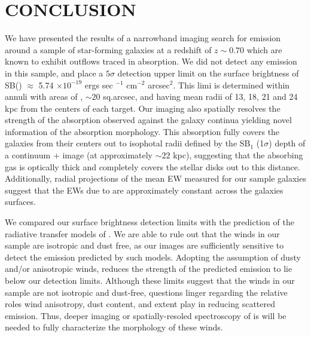 \documentclass[twocolumn]{aastex61}
\begin{document}
\section{CONCLUSION}\label{sec:conclusion}
We have presented the results of a narrowband imaging search for  emission around a sample of star-forming galaxies at a redshift of $z \sim 0.70$ which are known to exhibit outflows traced in  absorption. We did not detect any  emission in this sample, and place a $5\sigma$ detection upper limit on the surface brightness of SB() $\approx$ 5.74 $\times 10^{-19}$ ergs sec $^{-1}$ cm$^{-2}$ arcsec$^2$. This limi is determined within annuli with areas of , $\sim 20$ sq.arcsec, and having mean radii of 13, 18, 21 and 24 kpc from the centers of each target. Our imaging also spatially resolves the strength of the  absorption observed against the galaxy continua yielding novel information of the  absorption morphology. This absorption fully covers the galaxies from their centers out to isophotal radii defined by the SB$_1$ (1$\sigma$) depth of a continuum +  image (at approximately $\sim 22$ kpc), suggesting that the absorbing gas is optically thick and completely covers the stellar disks out to this distance. Additionally, radial projections of the mean EW measured for our sample galaxies suggest that the EWs due to  are approximately constant across the galaxies surfaces. 

We compared our surface brightness detection limits with the prediction of the radiative transfer models of \cite{Prochaska_2011}. We are able to rule out that the winds in our sample are isotropic and dust free, as our images are sufficiently sensitive to detect the emission predicted by such models. Adopting the assumption of dusty and/or anisotropic winds, reduces the strength of the predicted  emission to lie below our detection limits.  Although these limits suggest that the winds in our sample are not isotropic and dust-free, questions linger regarding the relative roles wind anisotropy, dust content, and extent play in reducing scattered emission. Thus, deeper imaging or spatially-resoled spectroscopy of  is will be needed to fully characterize the morphology of these winds. 
\end{document}
